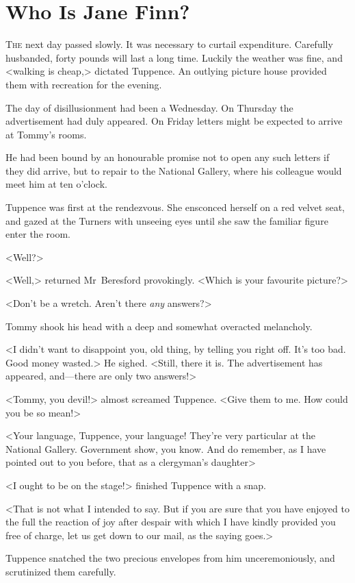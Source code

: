 \chapter{Who Is Jane Finn?} 

 \lettrine{T}{he} next day passed slowly. It was necessary to curtail expenditure. Carefully husbanded, forty pounds will last a long time. Luckily the weather was fine, and <walking is cheap,> dictated Tuppence. An outlying picture house provided them with recreation for the evening.

The day of disillusionment had been a Wednesday. On Thursday the advertisement had duly appeared. On Friday letters might be expected to arrive at Tommy's rooms.

He had been bound by an honourable promise not to open any such letters if they did arrive, but to repair to the National Gallery, where his colleague would meet him at ten o'clock.

Tuppence was first at the rendezvous. She ensconced herself on a red velvet seat, and gazed at the Turners with unseeing eyes until she saw the familiar figure enter the room.

<Well?>

<Well,> returned Mr~Beresford provokingly. <Which is your favourite picture?>

<Don't be a wretch. Aren't there \emph{any} answers?>

Tommy shook his head with a deep and somewhat overacted melancholy.

<I didn't want to disappoint you, old thing, by telling you right off. It's too bad. Good money wasted.> He sighed. <Still, there it is. The advertisement has appeared, and—there are only two answers!>

<Tommy, you devil!> almost screamed Tuppence. <Give them to me. How could you be so mean!>

<Your language, Tuppence, your language! They're very particular at the National Gallery. Government show, you know. And do remember, as I have pointed out to you before, that as a clergyman's daughter\longdash>

<I ought to be on the stage!> finished Tuppence with a snap.

<That is not what I intended to say. But if you are sure that you have enjoyed to the full the reaction of joy after despair with which I have kindly provided you free of charge, let us get down to our mail, as the saying goes.>

Tuppence snatched the two precious envelopes from him unceremoniously, and scrutinized them carefully.

